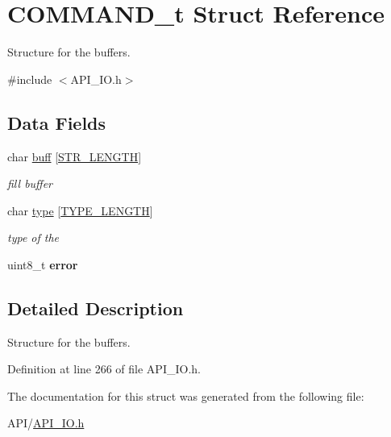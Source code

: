 \hypertarget{struct_c_o_m_m_a_n_d__t}{}\section{C\+O\+M\+M\+A\+N\+D\+\_\+t Struct Reference}
\label{struct_c_o_m_m_a_n_d__t}


Structure for the buffers.  




{\ttfamily \#include $<$A\+P\+I\+\_\+\+I\+O.\+h$>$}

\subsection*{Data Fields}
\begin{DoxyCompactItemize}
\item 
\mbox{\label{struct_c_o_m_m_a_n_d__t_a3ca56d05670fa13929584cd8aebae252}} 
char \hyperlink{struct_c_o_m_m_a_n_d__t_a3ca56d05670fa13929584cd8aebae252}{buff} \mbox{[}\hyperlink{_a_p_i___i_o_8h_a9e8aaf9c28f704136d8fc1ba043b6bf5}{S\+T\+R\+\_\+\+L\+E\+N\+G\+TH}\mbox{]}
\begin{DoxyCompactList}\small\item\em fill buffer \end{DoxyCompactList}\item 
\mbox{\label{struct_c_o_m_m_a_n_d__t_a106c2825d202a4530656fcd385d0c04b}} 
char \hyperlink{struct_c_o_m_m_a_n_d__t_a106c2825d202a4530656fcd385d0c04b}{type} \mbox{[}\hyperlink{_a_p_i___i_o_8h_a7be6924e0d85f3f82149ea31cca36887}{T\+Y\+P\+E\+\_\+\+L\+E\+N\+G\+TH}\mbox{]}
\begin{DoxyCompactList}\small\item\em type of the \end{DoxyCompactList}\item 
\mbox{\label{struct_c_o_m_m_a_n_d__t_adc64ccb7538429fe78e3fe0139267370}} 
uint8\+\_\+t {\bfseries error}
\end{DoxyCompactItemize}


\subsection{Detailed Description}
Structure for the buffers. 

Definition at line 266 of file A\+P\+I\+\_\+\+I\+O.\+h.



The documentation for this struct was generated from the following file\+:\begin{DoxyCompactItemize}
\item 
A\+P\+I/\hyperlink{_a_p_i___i_o_8h}{A\+P\+I\+\_\+\+I\+O.\+h}\end{DoxyCompactItemize}
